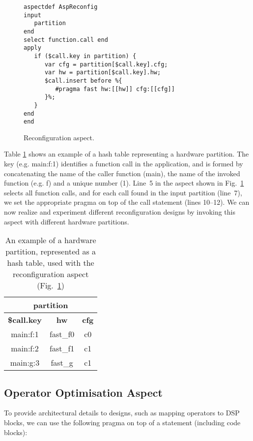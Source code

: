 \lstset{style=lara}
\begin{figure}[!h]
\begin{lstlisting}
aspectdef AspReconfig
input
   partition
end
select function.call end
apply
   if ($call.key in partition) {
      var cfg = partition[$call.key].cfg;
      var hw = partition[$call.key].hw;
      $call.insert before %{
         #pragma fast hw:[[hw]] cfg:[[cfg]]
      }%;
   }
end
end
\end{lstlisting}
\caption{Reconfiguration aspect.}
\label{fig:aspect-reconf}
\end{figure}

Table \ref{fig:aspect-hash} shows an example of a hash table representing
a hardware partition. The key (e.g. main:f:1) identifies a function call in the application, and is
formed by concatenating the name of the caller function (main), the name of the invoked function (e.g. f) and a
unique number (1).  Line~5 in the aspect shown in Fig.~\ref{fig:aspect-reconf} selects all function calls,
and for each call found in the input partition (line~7), we set the
appropriate pragma on top of the call statement (lines 10--12). We can now realize and experiment
different reconfiguration designs by invoking this aspect with different hardware partitions.


\begin{table}[!h]
\caption{An example of a hardware partition, represented as a hash table, used with the reconfiguration aspect (Fig.~\ref{fig:aspect-reconf})}
\label{fig:aspect-hash}
\centering
\begin{tabular}{c|c|c}
\hline
\multicolumn{3}{c}{\bf{partition}} \\
\hline
\bf{\$call.key} & \bf{hw} & \bf{cfg}  \\
\hline
main:f:1 & fast\_f0 & c0 \\
main:f:2 & fast\_f1 & c1 \\
main:g:3 & fast\_g & c1 \\
\hline
\end{tabular}
\end{table}

\subsection{Operator Optimisation Aspect}
\label{sect:asp_ops}
To provide architectural details to \MAXC{} designs, such as mapping operators to DSP blocks, we can use the following \MAXC{} pragma on top of a statement (including code blocks):
\vspace{2mm}

